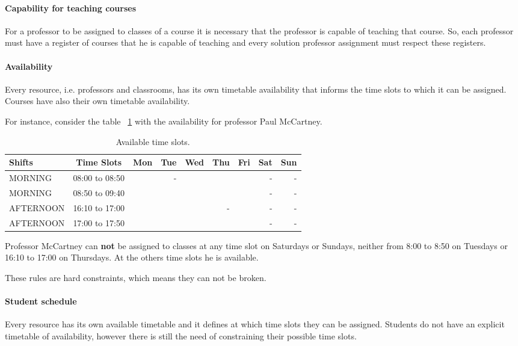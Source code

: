 \paragraph{Capability for teaching courses}
\label{constrcapab}

For a professor to be assigned to classes of a course it is necessary that the professor is capable of teaching that course. So, each professor must have a register of courses that he is capable of teaching and every solution professor assignment must respect these registers.


\paragraph{Availability}
\label{constravailab}

Every resource, i.e. professors and classrooms, has its own timetable availability that informs the time slots to which it can be assigned. Courses have also their own timetable availability.

For instance, consider the table ~\ref{tab:availabMT} with the availability for professor Paul McCartney.

\begin{table}[H]
\centering
\begin{tabular}{l|c|r|r|r|r|r|r|r}
Shifts & Time Slots & Mon & Tue & Wed & Thu & Fri & Sat & Sun \\\hline
MORNING & 08:00 to 08:50 & & - & & & & - & - \\
MORNING & 08:50 to 09:40 & & & & & & - & - \\
AFTERNOON & 16:10 to 17:00 & & & & - & & - & - \\
AFTERNOON & 17:00 to 17:50 & & & & & & - & -
\end{tabular}
\caption{\label{tab:availabMT}Available time slots.}
\end{table}

Professor McCartney can \textbf{not} be assigned to classes at any time slot on Saturdays or Sundays, neither from 8:00 to 8:50 on Tuesdays or 16:10 to 17:00 on Thursdays. At the others time slots he is available.

These rules are hard constraints, which means they can not be broken.


\paragraph{Student schedule}
\label{constrstudentsched}

Every resource has its own available timetable and it defines at which time slots they can be assigned. Students do not have an explicit timetable of availability, however there is still the need of constraining their possible time slots.

